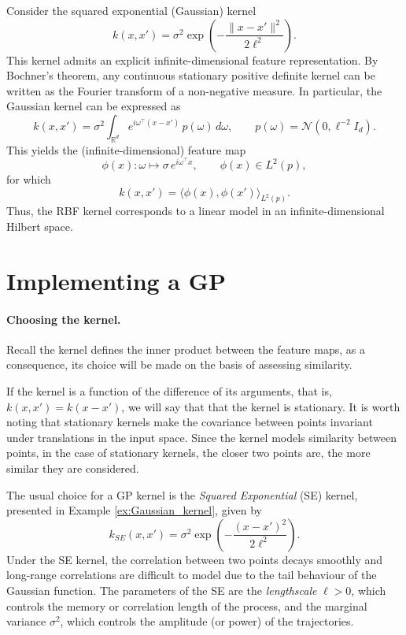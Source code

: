 \begin{example}
    \label{ex:Gaussian_kernel}
Consider the squared exponential (Gaussian) kernel
\[
k(x,x') = \sigma^2 \exp\!\left(-\frac{\|x-x'\|^2}{2\ell^2}\right).
\]
This kernel admits an explicit infinite-dimensional feature representation.
By Bochner’s theorem, any continuous stationary positive definite kernel can be written as
the Fourier transform of a non-negative measure.
In particular, the Gaussian kernel can be expressed as
\[
k(x,x')
=
\sigma^2
\int_{\mathbb R^d}
e^{i \omega^\top (x-x')}
\, p(\omega)\, d\omega,
\qquad
p(\omega)=\mathcal N\!\left(0,\ell^{-2}I_d\right).
\]
This yields the (infinite-dimensional) feature map
\[
\phi(x) : \omega \mapsto \sigma\, e^{i\omega^\top x},
\qquad
\phi(x)\in L^2(p),
\]
for which
\[
k(x,x') = \langle \phi(x), \phi(x') \rangle_{L^2(p)} .
\]
Thus, the RBF kernel corresponds to a linear model in an infinite-dimensional Hilbert space.
\end{example}



\section{Implementing a GP}

\paragraph{Choosing the kernel.}


\begin{remark}
    Recall the kernel defines the inner product between the feature maps, as a consequence, its choice will be made on the basis of assessing similarity.
\end{remark}

\begin{remark}
    If the kernel is a function of the difference of its arguments, that is, $k(x, x')=k(x-x')$, we will say that that the kernel is stationary. It is worth noting that stationary kernels make the covariance between points invariant under translations in the input space. Since the kernel models similarity between points, in the case of stationary kernels, the closer two points are, the more similar they are considered.
\end{remark}


The usual choice for a GP kernel is the \textit{Squared Exponential} (SE) kernel, presented in Example \ref{ex:Gaussian_kernel}, given by 
\begin{equation}\label{eq:gp_kernel_se}
	k_{SE}(x, x') = \sigma^2 \exp\left( - \frac{\left( x- x'\right)^2}{2\ell^2} \right).
\end{equation}
Under the SE kernel, the correlation between two points decays smoothly and long-range correlations are difficult to model due to the tail behaviour of the Gaussian function. The parameters of the SE are the \emph{lengthscale} $\ell>0$, which controls the memory or correlation length of the process, and the marginal variance $\sigma^2$, which controls the amplitude (or power) of the trajectories. 



